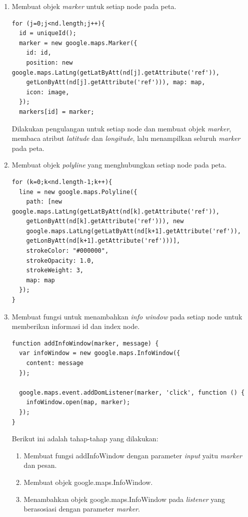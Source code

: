 \begin{enumerate}
  \item Membuat objek \textit{marker} untuk setiap node pada peta.
\begin{verbatim}
for (j=0;j<nd.length;j++){
  id = uniqueId();
  marker = new google.maps.Marker({
    id: id,
    position: new google.maps.LatLng(getLatByAtt(nd[j].getAttribute('ref')),
    getLonByAtt(nd[j].getAttribute('ref'))), map: map,
    icon: image,
  });
  markers[id] = marker;
\end{verbatim}
  Dilakukan pengulangan untuk setiap node dan membuat objek \textit{marker},
  membaca atribut \textit{latitude} dan \textit{longitude}, lalu menampilkan
  seluruh \textit{marker} pada peta.

  \item Membuat objek \textit{polyline} yang menghubungkan setiap node pada
  peta.
\begin{verbatim}
for (k=0;k<nd.length-1;k++){
  line = new google.maps.Polyline({
    path: [new google.maps.LatLng(getLatByAtt(nd[k].getAttribute('ref')),
    getLonByAtt(nd[k].getAttribute('ref'))), new
    google.maps.LatLng(getLatByAtt(nd[k+1].getAttribute('ref')),
    getLonByAtt(nd[k+1].getAttribute('ref')))], 
    strokeColor: "#000000",
    strokeOpacity: 1.0, 
    strokeWeight: 3,
    map: map
  });
}
\end{verbatim}
  
  \item Membuat fungsi untuk menambahkan \textit{info window} pada setiap node
  untuk memberikan informasi id dan index node.
\begin{verbatim}
function addInfoWindow(marker, message) {
  var infoWindow = new google.maps.InfoWindow({
    content: message
  });
  
  google.maps.event.addDomListener(marker, 'click', function () {
    infoWindow.open(map, marker);
  });
}
\end{verbatim}
  Berikut ini adalah tahap-tahap yang dilakukan:
  \begin{enumerate}
    \item Membuat fungsi addInfoWindow dengan parameter \textit{input} yaitu
    \textit{marker} dan pesan.
    
    \item Membuat objek google.maps.InfoWindow.
    
    \item Menambahkan objek google.maps.InfoWindow pada \textit{listener} yang
    berasosiasi dengan parameter \textit{marker}.
  \end{enumerate}
\end{enumerate}
